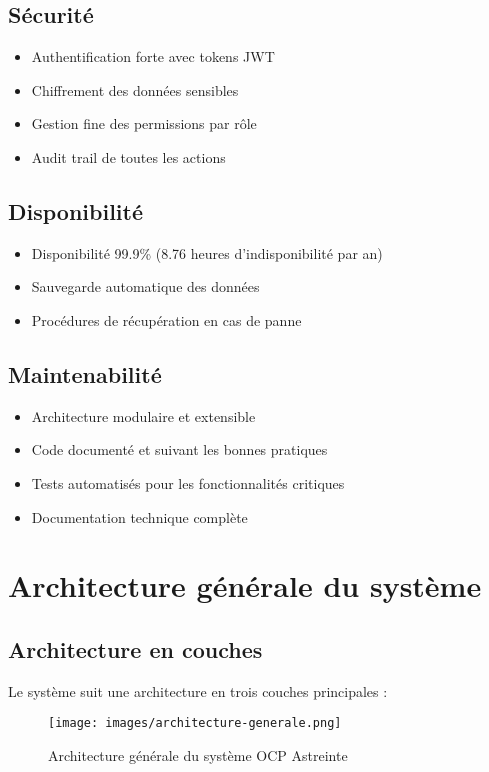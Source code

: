\subsection{Sécurité}
\begin{itemize}
    \item Authentification forte avec tokens JWT
    \item Chiffrement des données sensibles
    \item Gestion fine des permissions par rôle
    \item Audit trail de toutes les actions
\end{itemize}

\subsection{Disponibilité}
\begin{itemize}
    \item Disponibilité 99.9\% (8.76 heures d'indisponibilité par an)
    \item Sauvegarde automatique des données
    \item Procédures de récupération en cas de panne
\end{itemize}

\subsection{Maintenabilité}
\begin{itemize}
    \item Architecture modulaire et extensible
    \item Code documenté et suivant les bonnes pratiques
    \item Tests automatisés pour les fonctionnalités critiques
    \item Documentation technique complète
\end{itemize}

\section{Architecture générale du système}
\subsection{Architecture en couches}
Le système suit une architecture en trois couches principales :

\begin{figure}[h]
\centering
\texttt{[image: images/architecture-generale.png]}
\caption{Architecture générale du système OCP Astreinte}
\label{fig:architecture-generale}
\end{figure}

